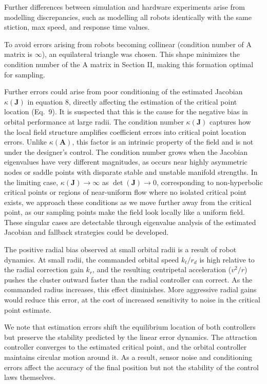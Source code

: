 \documentclass[lettersize,journal]{IEEEtran}
\begin{document}
Further differences between simulation and hardware experiments arise from modelling discrepancies, such as modelling all robots identically with the same stiction, max speed, and response time values. 

To avoid errors arising from robots becoming collinear (condition number of A matrix is $\infty$), an equilateral triangle was chosen. This shape minimizes the condition number of the A matrix in Section II, making this formation optimal for sampling.

Further errors could arise from poor conditioning of the estimated Jacobian $\kappa(\mathbf{J})$ in equation 8, directly affecting the estimation of the critical point location (Eq.~9). It is suspected that this is the cause for the negative bias in orbital performance at large radii. The condition number $\kappa(\mathbf{J})$ captures how the local field structure amplifies coefficient errors into critical point location errors. Unlike $\kappa(\mathbf{A})$, this factor is an intrinsic property of the field and is not under the designer's control. The condition number grows when the Jacobian eigenvalues have very different magnitudes, as occurs near highly asymmetric nodes or saddle points with disparate stable and unstable manifold strengths. In the limiting case, $\kappa(\mathbf{J}) \to \infty$ as $\det(\mathbf{J}) \to 0$, corresponding to non-hyperbolic critical points or regions of near-uniform flow where no isolated critical point exists, we approach these conditions as we move further away from the critical point, as our sampling points make the field look locally like a uniform field. These singular cases are detectable through eigenvalue analysis of the estimated Jacobian and fallback strategies could be developed.

The positive radial bias observed at small orbital radii is a result of robot dynamics. At small radii, the commanded orbital speed $k_t / r_d$ is high relative to the radial correction gain $k_r$, and the resulting centripetal acceleration ($v^2 / r$) pushes the cluster outward faster than the radial controller can correct. As the commanded radius increases, this effect diminishes. More aggressive radial gains would reduce this error, at the cost of increased sensitivity to noise in the critical point estimate.

We note that estimation errors shift the equilibrium location of both controllers but preserve the stability predicted by the linear error dynamics. The attraction controller converges to the estimated critical point, and the orbital controller maintains circular motion around it. As a result, sensor noise and conditioning errors affect the accuracy of the final position but not the stability of the control laws themselves.
\end{document}
